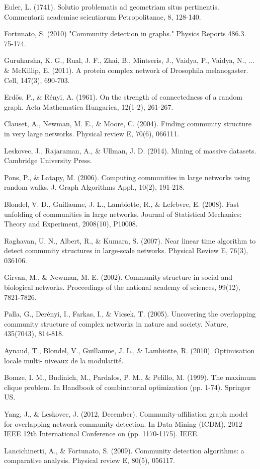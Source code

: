 \documentclass[10pt]{article}
\begin{document}
\begin{thebibliography}{40}

 Euler, L. (1741). Solutio problematis ad geometriam situs pertinentis. Commentarii academiae scientiarum Petropolitanae, 8, 128-140.

 Fortunato, S. (2010) "Community detection in graphs." Physics Reports 486.3. 75-174.

 Guruharsha, K. G., Rual, J. F., Zhai, B., Mintseris, J., Vaidya, P., Vaidya, N., ... \& McKillip, E. (2011). A protein complex network of Drosophila melanogaster. Cell, 147(3), 690-703.

 Erdős, P., \& Rényi, A. (1961). On the strength of connectedness of a random graph. Acta Mathematica Hungarica, 12(1-2), 261-267.

 Clauset, A., Newman, M. E., \& Moore, C. (2004). Finding community structure in very large networks. Physical review E, 70(6), 066111.

 Leskovec, J., Rajaraman, A., \& Ullman, J. D. (2014). Mining of massive datasets. Cambridge University Press.

 Pons, P., \& Latapy, M. (2006). Computing communities in large networks using random walks. J. Graph Algorithms Appl., 10(2), 191-218.

 Blondel, V. D., Guillaume, J. L., Lambiotte, R., \& Lefebvre, E. (2008). Fast unfolding of communities in large networks. Journal of Statistical Mechanics: Theory and Experiment, 2008(10), P10008.

 Raghavan, U. N., Albert, R., \& Kumara, S. (2007). Near linear time algorithm to detect community structures in large-scale networks. Physical Review E, 76(3), 036106.

 Girvan, M., \& Newman, M. E. (2002). Community structure in social and biological networks. Proceedings of the national academy of sciences, 99(12), 7821-7826.

 Palla, G., Derényi, I., Farkas, I., \& Vicsek, T. (2005). Uncovering the overlapping community structure of complex networks in nature and society. Nature, 435(7043), 814-818.

 Aynaud, T., Blondel, V., Guillaume, J. L., \& Lambiotte, R. (2010). Optimisation locale multi- niveaux de la modularité.

 Bomze, I. M., Budinich, M., Pardalos, P. M., \& Pelillo, M. (1999). The maximum clique problem. In Handbook of combinatorial optimization (pp. 1-74). Springer US.

 Yang, J., \& Leskovec, J. (2012, December). Community-affiliation graph model for overlapping network community detection. In Data Mining (ICDM), 2012 IEEE 12th International Conference on (pp. 1170-1175). IEEE.

 Lancichinetti, A., \& Fortunato, S. (2009). Community detection algorithms: a comparative analysis. Physical review E, 80(5), 056117.

\end{thebibliography}
\end{document}
